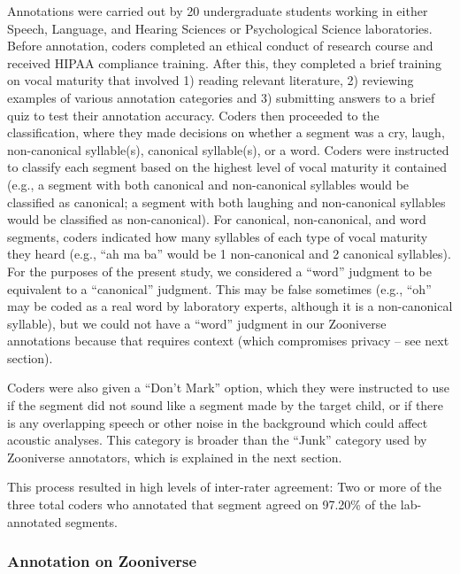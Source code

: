 \documentclass[english,,man]{apa6}
\begin{document}
Annotations were carried out by 20 undergraduate students working in either Speech, Language, and Hearing Sciences or Psychological Science laboratories. Before annotation, coders completed an ethical conduct of research course and received HIPAA compliance training. After this, they completed a brief training on vocal maturity that involved 1) reading relevant literature, 2) reviewing examples of various annotation categories and 3) submitting answers to a brief quiz to test their annotation accuracy. Coders then proceeded to the classification, where they made decisions on whether a segment was a cry, laugh, non-canonical syllable(s), canonical syllable(s), or a word. Coders were instructed to classify each segment based on the highest level of vocal maturity it contained (e.g., a segment with both canonical and non-canonical syllables would be classified as canonical; a segment with both laughing and non-canonical syllables would be classified as non-canonical). For canonical, non-canonical, and word segments, coders indicated how many syllables of each type of vocal maturity they heard (e.g., \enquote{ah ma ba} would be 1 non-canonical and 2 canonical syllables). For the purposes of the present study, we considered a \enquote{word} judgment to be equivalent to a \enquote{canonical} judgment. This may be false sometimes (e.g., \enquote{oh} may be coded as a real word by laboratory experts, although it is a non-canonical syllable), but we could not have a \enquote{word} judgment in our Zooniverse annotations because that requires context (which compromises privacy -- see next section).

Coders were also given a \enquote{Don't Mark} option, which they were instructed to use if the segment did not sound like a segment made by the target child, or if there is any overlapping speech or other noise in the background which could affect acoustic analyses. This category is broader than the \enquote{Junk} category used by Zooniverse annotators, which is explained in the next section.

This process resulted in high levels of inter-rater agreement: Two or more of the three total coders who annotated that segment agreed on 97.20\% of the lab-annotated segments.

\hypertarget{annotation-on-zooniverse}{%
\subsubsection{Annotation on Zooniverse}\label{annotation-on-zooniverse}}
\end{document}

